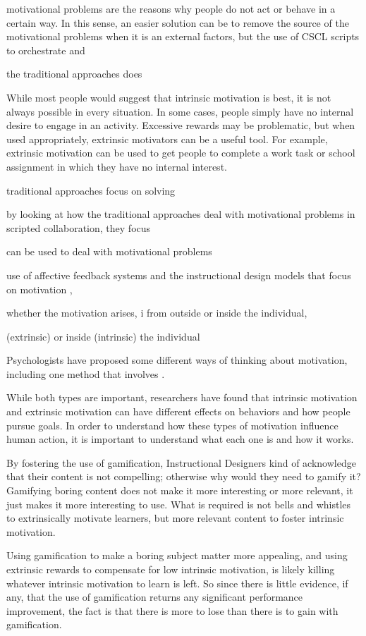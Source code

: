 motivational problems are the reasons why people do not act or behave in a certain way.
In this sense, an easier solution can be to remove the source of the motivational problems when it is an external factors, but the use of CSCL scripts to orchestrate and 


the traditional approaches does 


While most people would suggest that intrinsic motivation is best, it is not always possible in every situation. In some cases, people simply have no internal desire to engage in an activity. Excessive rewards may be problematic, but when used appropriately, extrinsic motivators can be a useful tool. For example, extrinsic motivation can be used to get people to complete a work task or school assignment in which they have no internal interest.




traditional approaches focus on solving 

by looking at how the traditional approaches deal with motivational problems in scripted collaboration, they focus 

can be used to deal with motivational problems 

use of affective feedback systems and the instructional design models that focus on motivation ,  

whether the motivation arises, i from outside or inside the individual, 

(extrinsic) or inside (intrinsic) the individual

Psychologists have proposed some different ways of thinking about motivation, including one method that involves .


While both types are important, researchers have found that intrinsic motivation and extrinsic motivation can have different effects on behaviors and how people pursue goals. In order to understand how these types of motivation influence human action, it is important to understand what each one is and how it works.



By fostering the use of gamification, Instructional Designers kind of acknowledge that their content is not compelling; otherwise why would they need to gamify it? Gamifying boring content does not make it more interesting or more relevant, it just makes it more interesting to use. What is required is not bells and whistles to extrinsically motivate learners, but more relevant content to foster intrinsic motivation.

Using gamification to make a boring subject matter more appealing, and using extrinsic rewards to compensate for low intrinsic motivation, is likely killing whatever intrinsic motivation to learn is left. So since there is little evidence, if any, that the use of gamification returns any significant performance improvement, the fact is that there is more to lose than there is to gain with gamification.

